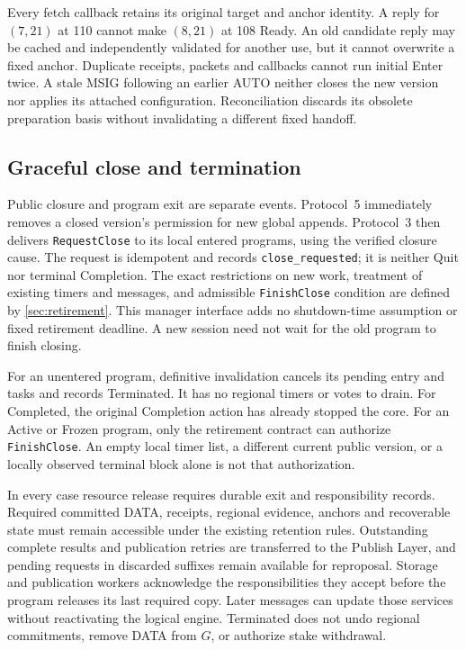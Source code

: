 Every fetch callback retains its original target and anchor identity.
A reply for $(7,21)$ at 110 cannot make $(8,21)$ at 108 Ready.
An old candidate reply may be cached and independently validated for
another use, but it cannot overwrite a fixed anchor. Duplicate receipts,
packets and callbacks cannot run initial Enter twice. A stale MSIG
following an earlier AUTO neither closes the new version nor applies
its attached configuration. Reconciliation discards its obsolete
preparation basis without invalidating a different fixed handoff.

\subsection{Graceful close and termination}
\label{sec:runtime-close}
Public closure and program exit are separate events. Protocol~5
immediately removes a closed version's permission for new global
appends. Protocol~3 then delivers \texttt{RequestClose} to its local
entered programs, using the verified closure cause. The request is
idempotent and records \texttt{close\_requested}; it is neither Quit
nor terminal Completion. The exact restrictions on new work, treatment
of existing timers and messages, and admissible \texttt{FinishClose}
condition are defined by \cref{sec:retirement}. This manager interface
adds no shutdown-time assumption or fixed retirement deadline. A new
session need not wait for the old program to finish closing.

For an unentered program, definitive invalidation cancels its pending
entry and tasks and records Terminated. It has no regional timers or
votes to drain. For Completed, the original Completion action has
already stopped the core. For an Active or Frozen program, only the
retirement contract can authorize \texttt{FinishClose}. An empty local
timer list, a different current public version, or a locally observed
terminal block alone is not that authorization.

In every case resource release requires durable exit and responsibility
records. Required committed DATA, receipts, regional evidence, anchors
and recoverable state must remain accessible under the existing
retention rules. Outstanding complete results and publication retries
are transferred to the Publish Layer, and pending requests in discarded
suffixes remain available for reproposal. Storage and publication
workers acknowledge the responsibilities they accept before the
program releases its last required copy. Later messages can update
those services without reactivating the logical engine. Terminated
does not undo regional commitments, remove DATA from $G$, or authorize
stake withdrawal.
